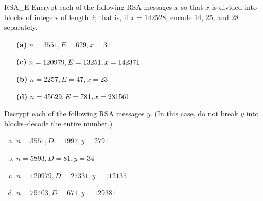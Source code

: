\begin{exercise}{RSA_E}
Encrypt each of the following RSA messages $x$ so that $x$ is divided
into blocks of integers of length 2;  that is, if $x = 142528$, encode 
14, 25, and 28 separately.
 
\vspace{3pt}        %
 \hspace{-7pt}
\begin{minipage}[t]{4.6in}
\noindent
\begin{minipage}[t]{2.25in}
\begin{itemize}
 
 \item[{\bf (a)}]
$n = 3551, E = 629, x = 31$
 
 \item[{\bf (c)}]
$n = 120979, E = 13251,\\ x = 142371$
 
\end{itemize}
\end{minipage} \hfill
\begin{minipage}[t]{2.25in}
\begin{itemize}
 
 \item[{\bf (b)}]
$n = 2257, E = 47, x = 23$
 
 \item[{\bf (d)}]
$n = 45629, E = 781,\\ x = 231561$
 
\end{itemize}
\end{minipage}
\end{minipage}
\end{exercise}
 
\begin{exercise}{}
Decrypt each of the following RSA messages $y$. (In this case, do not break $y$ into blocks--decode the entire number.)
 
 \begin{enumerate}[(a)]
\item
 $n = 3551, D = 1997, y = 2791$
 \item
$n = 5893, D = 81, y = 34$
 \item
$n = 120979, D = 27331, y = 112135$
 \item
$n = 79403, D = 671, y = 129381$
 \end{enumerate}
 \end{exercise}
 
